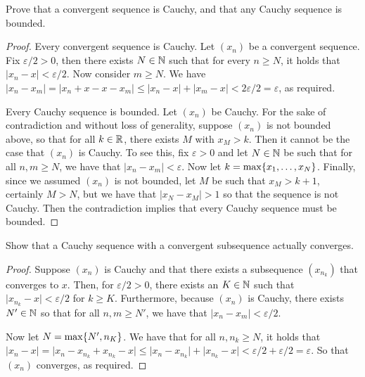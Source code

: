 \begin{exercise}{14}
Prove that a convergent sequence is Cauchy, and that any Cauchy sequence is bounded.
\end{exercise}
\begin{proof}
Every convergent sequence is Cauchy. Let $(x_n)$ be a convergent sequence. Fix $\varepsilon/2>0$, then there exists $N\in\mathbb{N}$ such that for every $n\geq N$, it holds that $\lvert x_n-x\rvert<\varepsilon/2$. Now consider $m\geq N$. We have $\lvert x_n-x_m\rvert = \lvert x_n+x-x-x_m\lvert \leq \lvert x_n-x\rvert + \lvert x_m-x\rvert<2\varepsilon/2=\varepsilon$, as required.

Every Cauchy sequence is bounded. Let $(x_n)$ be Cauchy. For the sake of contradiction and without loss of generality, suppose $(x_n)$ is not bounded above, so that for all $k\in\mathbb{R}$, there exists $M$ with $x_M>k$. Then it cannot be the case that $(x_n)$ is Cauchy. To see this, fix $\varepsilon>0$ and let $N\in\mathbb{N}$ be such that for all $n,m\geq N$, we have that $\lvert x_n-x_m\rvert<\varepsilon$. Now let $k=\max\{x_1,\dots,x_N\}$. Finally, since we assumed $(x_n)$ is not bounded, let $M$ be such that $x_M>k+1$, certainly $M>N$, but we have that $\lvert x_N-x_M\rvert>1$ so that the sequence is not Cauchy. Then the contradiction implies that every Cauchy sequence must be bounded.
\end{proof}

\begin{exercise}{15}
Show that a Cauchy sequence with a convergent subsequence actually converges.
\end{exercise}
\begin{proof}
Suppose $(x_n)$ is Cauchy and that there exists a subsequence $(x_{n_{k}})$ that converges to $x$. Then, for $\varepsilon/2>0$, there exists an $K\in\mathbb{N}$ such that $\lvert x_{n_{k}}-x\rvert<\varepsilon/2$ for $k\geq K$. Furthermore, because $(x_n)$ is Cauchy, there exists $N'\in\mathbb{N}$ so that for all $n,m\geq N'$, we have that $\lvert x_n-x_m\rvert<\varepsilon/2$. 

Now let $N=\max\{N', n_K\}$. We have that for all $n,n_k\geq N$, it holds that $\lvert x_n-x\rvert= \lvert x_n-x_{n_k}+x_{n_k}-x\rvert\leq\lvert x_n-x_{n_k}\rvert+\lvert x_{n_k}-x\rvert <\varepsilon/2+\varepsilon/2=\varepsilon$. So that $(x_n)$ converges, as required.
\end{proof}

